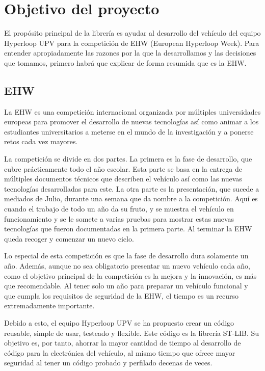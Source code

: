 \documentclass{report}
\begin{document}
\setlength{\parindent}{15pt}
\newpage

\section{Objetivo del proyecto}
El propósito principal de la librería es ayudar al desarrollo del vehículo del equipo Hyperloop UPV para la competición de EHW (European Hyperloop Week). Para entender apropiadamente las razones por la que la desarrollamos y las decisiones que tomamos, primero habrá que explicar de forma resumida que es la EHW. \cite{web:EHW:homepage} \par \vspace{0.3 cm}

\subsection{EHW}
La EHW es una competición internacional organizada por múltiples universidades europeas para promover el desarrollo de nuevas tecnologías así como animar a los estudiantes universitarios a meterse en el mundo de la investigación y a ponerse retos cada vez mayores. \par
La competición se divide en dos partes. La primera es la fase de desarrollo, que cubre prácticamente todo el año escolar. Esta parte se basa en la entrega de múltiples documentos técnicos que describen el vehículo así como las nuevas tecnologías desarrolladas para este. La otra parte es la presentación, que sucede a mediados de Julio, durante una semana que da nombre a la competición. Aquí es cuando el trabajo de todo un año da su fruto, y se muestra el vehículo en funcionamiento y se le somete a varias pruebas para mostrar estas nuevas tecnologías que fueron documentadas en la primera parte. Al terminar la EHW queda recoger y comenzar un nuevo ciclo. \par \vspace{0.3 cm}
Lo especial de esta competición es que la fase de desarrollo dura solamente un año. Además, aunque no sea obligatorio presentar un nuevo vehículo cada año, como el objetivo principal de la competición es la mejora y la innovación, es más que recomendable. Al tener solo un año para preparar un vehículo funcional y que cumpla los requisitos de seguridad de la EHW, el tiempo es un recurso extremadamente importante. \par \vspace{0.3 cm}
Debido a esto, el equipo Hyperloop UPV se ha propuesto crear un código reusable, simple de usar, testeado y flexible. Este código es la librería ST-LIB. Su objetivo es, por tanto, ahorrar la mayor cantidad de tiempo al desarrollo de código para la electrónica del vehículo, al mismo tiempo que ofrece mayor seguridad al tener un código probado y perfilado decenas de veces. \par
\end{document}
